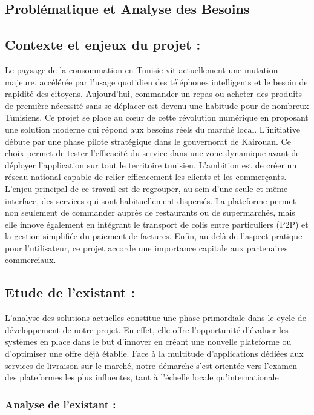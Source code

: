 \documentclass[12pt,fleqn,a4paper]{report}
\begin{document}
\begin{justify}
\vspace{2cm}

\chapter{Problématique et Analyse des Besoins}

\section{Contexte et enjeux du projet :}

Le paysage de la consommation en Tunisie vit actuellement une mutation majeure, accélérée par l'usage quotidien des téléphones intelligents et le besoin de rapidité des citoyens. Aujourd'hui, commander un repas ou acheter des produits de première nécessité sans se déplacer est devenu une habitude pour de nombreux Tunisiens. Ce projet se place au cœur de cette révolution numérique en proposant une solution moderne qui répond aux besoins réels du marché local.  L'initiative débute par une phase pilote stratégique dans le gouvernorat de Kairouan. Ce choix permet de tester l'efficacité du service dans une zone dynamique avant de déployer l'application sur tout le territoire tunisien. L'ambition est de créer un réseau national capable de relier efficacement les clients et les commerçants.  L'enjeu principal de ce travail est de regrouper, au sein d'une seule et même interface, des services qui sont habituellement dispersés. La plateforme permet non seulement de commander auprès de restaurants ou de supermarchés, mais elle innove également en intégrant le transport de colis entre particuliers (P2P) et la gestion simplifiée du paiement de factures.  Enfin, au-delà de l'aspect pratique pour l'utilisateur, ce projet accorde une importance capitale aux partenaires commerciaux.
\newpage
\section{Etude de l'existant :}
L'analyse des solutions actuelles constitue une phase primordiale dans le cycle de développement de notre projet. En effet, elle offre l'opportunité d'évaluer les systèmes en place dans le but d'innover en créant une nouvelle plateforme ou d'optimiser une offre déjà établie. Face à la multitude d'applications dédiées aux services de livraison sur le marché, notre démarche s'est orientée vers l'examen des plateformes les plus influentes, tant à l'échelle locale qu'internationale
\subsection{Analyse de l'existant :}



\end{justify}
\end{document}
